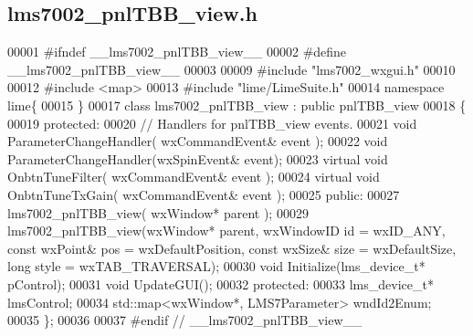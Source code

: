 \subsection{lms7002\+\_\+pnl\+T\+B\+B\+\_\+view.\+h}
\label{lms7002__pnlTBB__view_8h_source}

\begin{DoxyCode}
00001 \textcolor{preprocessor}{#ifndef \_\_lms7002\_pnlTBB\_view\_\_}
00002 \textcolor{preprocessor}{#define \_\_lms7002\_pnlTBB\_view\_\_}
00003 
00009 \textcolor{preprocessor}{#include "lms7002_wxgui.h"}
00010 
00012 \textcolor{preprocessor}{#include <map>}
00013 \textcolor{preprocessor}{#include "lime/LimeSuite.h"}
00014 \textcolor{keyword}{namespace }lime\{
00015 \}
00017 \textcolor{keyword}{class }lms7002_pnlTBB_view : \textcolor{keyword}{public} pnlTBB_view
00018 \{
00019     \textcolor{keyword}{protected}:
00020         \textcolor{comment}{// Handlers for pnlTBB\_view events.}
00021         \textcolor{keywordtype}{void} ParameterChangeHandler( wxCommandEvent& event );
00022         \textcolor{keywordtype}{void} ParameterChangeHandler(wxSpinEvent& event);
00023         \textcolor{keyword}{virtual} \textcolor{keywordtype}{void} OnbtnTuneFilter( wxCommandEvent& event );
00024         \textcolor{keyword}{virtual} \textcolor{keywordtype}{void} OnbtnTuneTxGain( wxCommandEvent& event );
00025     \textcolor{keyword}{public}:
00027         lms7002_pnlTBB_view( wxWindow* parent );
00029     lms7002_pnlTBB_view(wxWindow* parent, wxWindowID \textcolor{keywordtype}{id} = wxID\_ANY, \textcolor{keyword}{const} wxPoint& pos = wxDefaultPosition,
       \textcolor{keyword}{const} wxSize& size = wxDefaultSize, \textcolor{keywordtype}{long} style = wxTAB\_TRAVERSAL);
00030     \textcolor{keywordtype}{void} Initialize(lms_device_t* pControl);
00031     \textcolor{keywordtype}{void} UpdateGUI();
00032 \textcolor{keyword}{protected}:
00033     lms_device_t* lmsControl;
00034     std::map<wxWindow*, LMS7Parameter> wndId2Enum;
00035 \};
00036 
00037 \textcolor{preprocessor}{#endif // \_\_lms7002\_pnlTBB\_view\_\_}
\end{DoxyCode}
